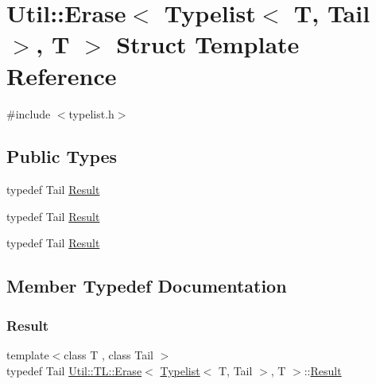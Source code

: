 \hypertarget{structUtil_1_1TL_1_1Erase_3_01Typelist_3_01T_00_01Tail_01_4_00_01T_01_4}{}\section{Util\+:\+:Erase$<$ Typelist$<$ T, Tail $>$, T $>$ Struct Template Reference}
\label{structUtil_1_1TL_1_1Erase_3_01Typelist_3_01T_00_01Tail_01_4_00_01T_01_4}


{\ttfamily \#include $<$typelist.\+h$>$}

\subsection*{Public Types}
\begin{DoxyCompactItemize}
\item 
typedef Tail \mbox{\hyperlink{structUtil_1_1TL_1_1Erase_3_01Typelist_3_01T_00_01Tail_01_4_00_01T_01_4_a847c2a353c4f86e0785cca222a67564e}{Result}}
\item 
typedef Tail \mbox{\hyperlink{structUtil_1_1TL_1_1Erase_3_01Typelist_3_01T_00_01Tail_01_4_00_01T_01_4_a847c2a353c4f86e0785cca222a67564e}{Result}}
\item 
typedef Tail \mbox{\hyperlink{structUtil_1_1TL_1_1Erase_3_01Typelist_3_01T_00_01Tail_01_4_00_01T_01_4_a847c2a353c4f86e0785cca222a67564e}{Result}}
\end{DoxyCompactItemize}


\subsection{Member Typedef Documentation}
\mbox{\label{structUtil_1_1TL_1_1Erase_3_01Typelist_3_01T_00_01Tail_01_4_00_01T_01_4_a847c2a353c4f86e0785cca222a67564e}} 
\subsubsection{\texorpdfstring{Result}{Result}\hspace{0.1cm}{\footnotesize\ttfamily [1/3]}}
{\footnotesize\ttfamily template$<$class T , class Tail $>$ \\
typedef Tail \mbox{\hyperlink{structUtil_1_1TL_1_1Erase}{Util\+::\+T\+L\+::\+Erase}}$<$ \mbox{\hyperlink{structUtil_1_1Typelist}{Typelist}}$<$ T, Tail $>$, T $>$\+::\mbox{\hyperlink{structUtil_1_1TL_1_1Erase_3_01Typelist_3_01T_00_01Tail_01_4_00_01T_01_4_a847c2a353c4f86e0785cca222a67564e}{Result}}}

